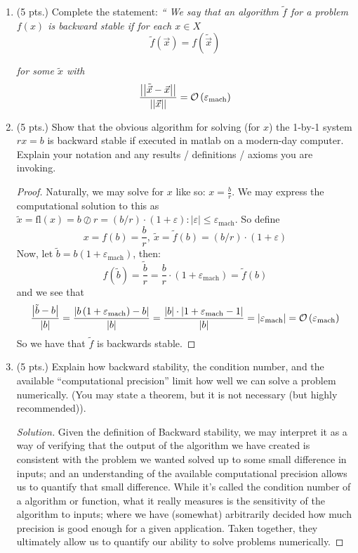 \documentclass[12pt]{article}
\newcommand{\BigO}[1]{\ensuremath\mathcal{O}\left(#1\right)}
\newcommand{\gnorm}[1]{\left|\left|#1\right|\right|}
\newcommand{\abs}[1]{\left|#1\right|}
\newcommand{\parens}[1]{\left(#1\right)}
\newcommand{\vep}{\varepsilon}
\newcommand{\fl}[1]{\text{fl}\left(#1\right)}
\begin{document}
\begin{enumerate}
\begin{enumerate}
     \item (5 pts.)  Complete the statement: \textit{`` We say that an
     algorithm $\tilde{f}$ for a problem $f(x)$ is \emph{backward
     stable} if for each $x\in X$}
	$$\tilde{f}\parens{\vec{x}} = f\parens{\tilde{\vec{x}}}$$
     
     \textit{for some $\tilde{x}$ with}
     $$\frac{\gnorm{\tilde{\vec{x}} - \vec{x}}}{\gnorm{\vec{x}}} = \BigO{\vep_{\text{mach}}}$$
     
     
   \item (5 pts.) Show that the obvious algorithm for solving (for $x$) the
     1-by-1 system $rx=b$ is backward stable if executed in matlab on a
     modern-day computer.  Explain your notation and any results / definitions
     / axioms you are invoking.
     \begin{proof}
     Naturally, we may solve for $x$ like so: $x = \frac{b}{r}$. We may express the computational solution to this as $\tilde{x} = \fl{x} = b \oslash r = (b/r)\cdot(1 + \vep):\abs{\vep} \leq \vep_{\text{mach}}$. So define
     $$x = f(b) = \frac{b}{r},\ \tilde{x} = \tilde{f}(b) = (b/r)\cdot(1+\vep)$$ 
     Now, let $\tilde{b} = b(1 + \vep_{\text{mach}})$, then:
     $$f(\tilde{b}) = \frac{\tilde{b}}{r} = \frac{b}{r}\cdot\parens{1 + \vep_{\text{mach}}} = \tilde{f}\parens{b}$$
     and we see that
     $$\frac{\abs{\tilde{b} - b}}{\abs{b}} = \frac{\abs{b\parens{1+\vep_{\text{mach}}} - b}}{\abs{b}} = \frac{\abs{b}\cdot \abs{1+\vep_{\text{mach}} - 1}}{\abs{b}} = \abs{\vep_{\text{mach}}} = \BigO{\vep_{\text{mach}}}$$
     So we have that $\tilde{f}$ is backwards stable.
     
     \end{proof}


   \item (5 pts.) Explain how backward stability, the condition number, and
     the available ``computational precision'' limit how well we can solve a
     problem numerically.  (You may state a theorem, but it is not necessary
     (but highly recommended)).
     \begin{proof}[Solution]
     Given the definition of Backward stability, we may interpret it as a way of verifying that the output of the algorithm we have created is consistent with the problem we wanted solved up to some small difference in inputs; and an understanding of the available computational precision allows us to quantify that small difference. While it's called the condition number of a algorithm or function, what it really measures is the sensitivity of the algorithm to inputs; where we have (somewhat) arbitrarily decided how much precision is good enough for a given application. Taken together, they ultimately allow us to quantify our ability to solve problems numerically.
     \end{proof}



\end{enumerate}
\end{enumerate}
\end{document}

